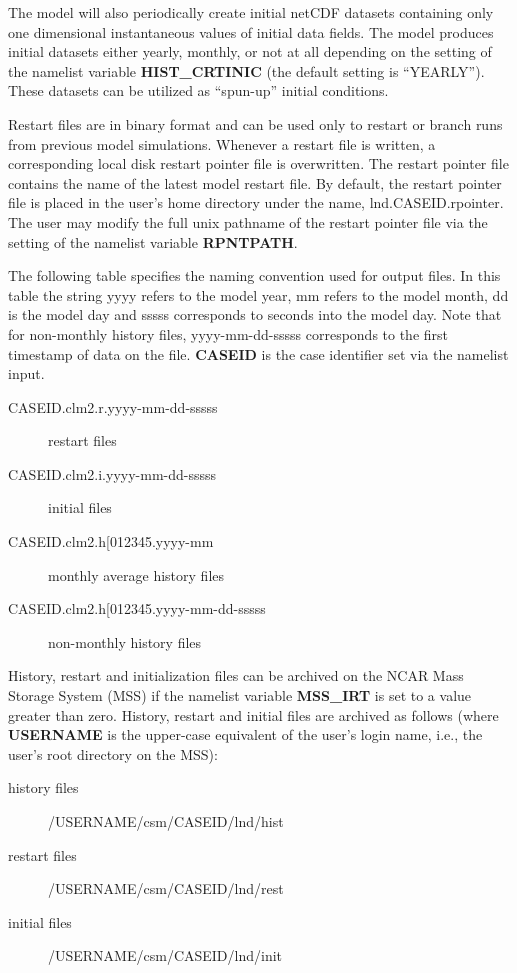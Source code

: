 The model will also periodically create initial netCDF datasets
containing only one dimensional instantaneous values of initial data
fields. The model produces initial datasets either yearly, monthly, or
not at all depending on the setting of the namelist variable {\bf
HIST\_CRTINIC} (the default setting is ``YEARLY'').  These datasets
can be utilized as ``spun-up'' initial conditions.

Restart files are in binary format and can be used only to restart or
branch runs from previous model simulations.  Whenever a restart file
is written, a corresponding local disk restart pointer file is
overwritten. The restart pointer file contains the name of the latest
model restart file. By default, the restart pointer file is placed in
the user's home directory under the name, lnd.CASEID.rpointer. The
user may modify the full unix pathname of the restart pointer file via
the setting of the namelist variable {\bf RPNTPATH}.

The following table specifies the naming convention used for output
files.  In this table the string yyyy refers to the model year, mm
refers to the model month, dd is the model day and sssss corresponds
to seconds into the model day. Note that for non-monthly history
files, yyyy-mm-dd-sssss corresponds to the first timestamp of data on
the file. {\bf CASEID} is the case identifier set via the namelist
input.

\begin{description}
\item [CASEID.clm2.r.yyyy-mm-dd-sssss ] restart files
\item [CASEID.clm2.i.yyyy-mm-dd-sssss ] initial files
\item [CASEID.clm2.h[012345.yyyy-mm ] monthly average history files
\item [CASEID.clm2.h[012345.yyyy-mm-dd-sssss ] non-monthly history files 
\end{description}

History, restart and initialization files can be archived on the NCAR
Mass Storage System (MSS) if the namelist variable {\bf MSS\_IRT} is
set to a value greater than zero.  History, restart and initial files are
archived as follows (where {\bf USERNAME} is the upper-case equivalent
of the user's login name, i.e., the user's root directory on the MSS):

\begin{description} 
 \item [history files] /USERNAME/csm/CASEID/lnd/hist
 \item [restart files] /USERNAME/csm/CASEID/lnd/rest
 \item [initial files] /USERNAME/csm/CASEID/lnd/init
\end{description}
 
